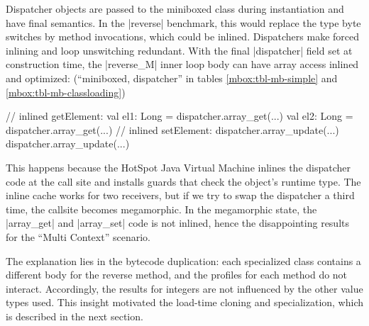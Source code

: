 Dispatcher objects are passed to the miniboxed class during instantiation and have final semantics. In the |reverse| benchmark, this would replace the type byte switches by method invocations, which could be inlined. Dispatchers make forced inlining and loop unswitching redundant. With the final |dispatcher| field set at construction time, the |reverse_M| inner loop body can have array access inlined and optimized: (``miniboxed,  dispatcher'' in tables \ref{mbox:tbl-mb-simple} and \ref{mbox:tbl-mb-classloading})

\begin{lstlisting-nobreak}
 // inlined getElement:
 val el1: Long = dispatcher.array_get(...)
 val el2: Long = dispatcher.array_get(...)
 // inlined setElement:
 dispatcher.array_update(...)
 dispatcher.array_update(...)
\end{lstlisting-nobreak}

 This happens because the HotSpot Java Virtual Machine inlines the dispatcher code at the call site and installs guards that check the object's runtime type. The inline cache works for two receivers, but if we try to swap the dispatcher a third time, the callsite becomes megamorphic. In the megamorphic state, the |array_get| and |array_set| code is not inlined, hence the disappointing results for the ``Multi Context'' scenario.  

 The explanation lies in the bytecode duplication: each specialized class contains a different body for the reverse method, and the profiles for each method do not interact. Accordingly, the results for integers are not influenced by the other value types used. This insight motivated the load-time cloning and specialization, which is described in the next section.
